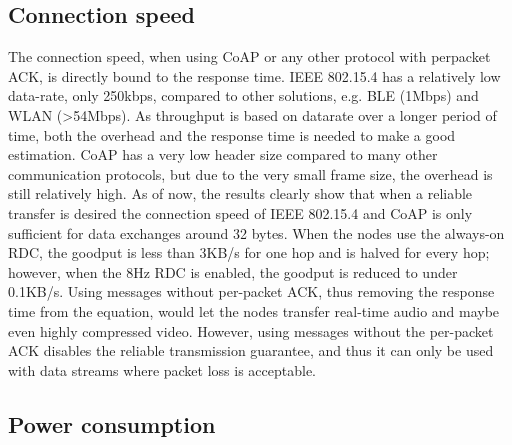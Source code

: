 \subsection{Connection speed}

The connection speed,
	when using CoAP or any other protocol with perpacket ACK,
	is directly bound to the response time.
IEEE 802.15.4 has a relatively low data-rate,
	only 250kbps,
	compared to other solutions,
	e.g.
BLE (1Mbps) and WLAN (>54Mbps).
As throughput is based on datarate over a longer period of time,
	both the overhead and the response time is needed to make a good estimation.
CoAP has a very low header size compared to many other communication protocols,
	but due to the very small frame size,
	the overhead is still relatively high.
As of now,
	the results clearly show that when a reliable transfer is desired the connection speed of IEEE 802.15.4 and CoAP is only sufficient for data exchanges around 32 bytes.
When the nodes use the always-on RDC,
	the goodput is less than 3KB/s for one hop and is halved for every hop;
	however,
	when the 8Hz RDC is enabled,
	the goodput is reduced to under 0.1KB/s.
Using messages without per-packet ACK,
	thus removing the response time from the equation,
	would let the nodes transfer real-time audio and maybe even highly compressed video.
However,
	using messages without the per-packet ACK disables the reliable transmission guarantee,
	and thus it can only be used with data streams where packet loss is acceptable.


\subsection{Power consumption}


